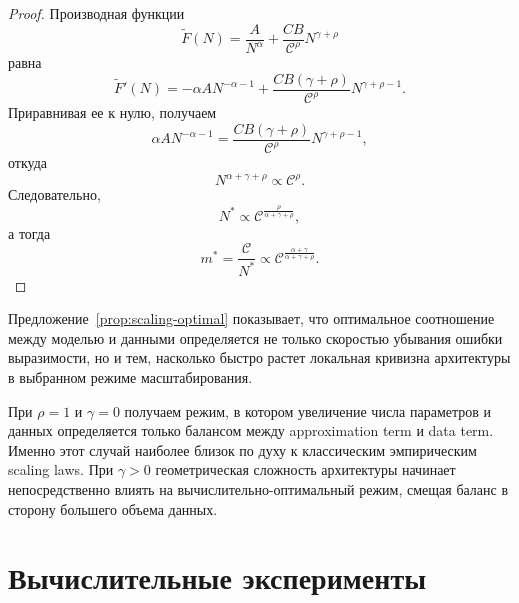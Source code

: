 \begin{proof}
    Производная функции
    \begin{equation}
        \widetilde F(N)
        =
        \frac{A}{N^{\alpha}}
        +
        \frac{CB}{\mathcal C^{\rho}}N^{\gamma+\rho}
    \end{equation}
    равна
    \begin{equation}
        \widetilde F'(N)
        =
        -\alpha A N^{-\alpha-1}
        +
        \frac{CB(\gamma+\rho)}{\mathcal C^{\rho}}N^{\gamma+\rho-1}.
    \end{equation}
    Приравнивая ее к нулю, получаем
    \begin{equation}
        \alpha A N^{-\alpha-1}
        =
        \frac{CB(\gamma+\rho)}{\mathcal C^{\rho}}N^{\gamma+\rho-1},
    \end{equation}
    откуда
    \begin{equation}
        N^{\alpha+\gamma+\rho}
        \propto
        \mathcal C^{\rho}.
    \end{equation}
    Следовательно,
    \begin{equation}
        N^*
        \propto
        \mathcal C^{\frac{\rho}{\alpha+\gamma+\rho}},
    \end{equation}
    а тогда
    \begin{equation}
        m^*
        =
        \frac{\mathcal C}{N^*}
        \propto
        \mathcal C^{\frac{\alpha+\gamma}{\alpha+\gamma+\rho}}.
    \end{equation}
\end{proof}

Предложение~\ref{prop:scaling-optimal} показывает, что оптимальное соотношение между моделью и данными определяется не только скоростью убывания ошибки выразимости, но и тем, насколько быстро растет локальная кривизна архитектуры в выбранном режиме масштабирования.

\begin{remark}
    При $\rho=1$ и $\gamma=0$ получаем режим, в котором увеличение числа параметров и данных определяется только балансом между approximation term и data term. Именно этот случай наиболее близок по духу к классическим эмпирическим scaling laws. При $\gamma>0$ геометрическая сложность архитектуры начинает непосредственно влиять на вычислительно-оптимальный режим, смещая баланс в сторону большего объема данных.
\end{remark}

\section{Вычислительные эксперименты}

